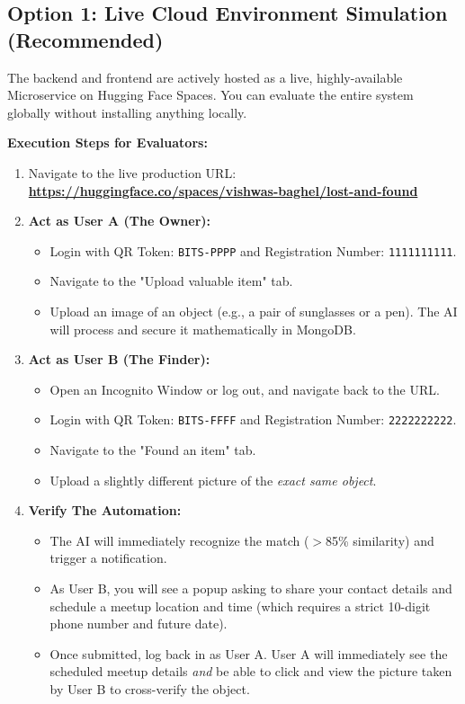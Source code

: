 \documentclass[12pt,a4paper]{article}
\begin{document}
\subsection{Option 1: Live Cloud Environment Simulation (Recommended)}
The backend and frontend are actively hosted as a live, highly-available Microservice on Hugging Face Spaces. You can evaluate the entire system globally without installing anything locally.

\textbf{Execution Steps for Evaluators:}
\begin{enumerate}
    \item Navigate to the live production URL: \textbf{\url{https://huggingface.co/spaces/vishwas-baghel/lost-and-found}}
    \item \textbf{Act as User A (The Owner):} 
    \begin{itemize}
        \item Login with QR Token: \texttt{BITS-PPPP} and Registration Number: \texttt{1111111111}.
        \item Navigate to the "Upload valuable item" tab.
        \item Upload an image of an object (e.g., a pair of sunglasses or a pen). The AI will process and secure it mathematically in MongoDB.
    \end{itemize}
    \item \textbf{Act as User B (The Finder):}
    \begin{itemize}
        \item Open an Incognito Window or log out, and navigate back to the URL.
        \item Login with QR Token: \texttt{BITS-FFFF} and Registration Number: \texttt{2222222222}.
        \item Navigate to the "Found an item" tab.
        \item Upload a slightly different picture of the \textit{exact same object}.
    \end{itemize}
    \item \textbf{Verify The Automation:}
    \begin{itemize}
        \item The AI will immediately recognize the match ($>$85\% similarity) and trigger a notification.
        \item As User B, you will see a popup asking to share your contact details and schedule a meetup location and time (which requires a strict 10-digit phone number and future date).
        \item Once submitted, log back in as User A. User A will immediately see the scheduled meetup details \textit{and} be able to click and view the picture taken by User B to cross-verify the object.
    \end{itemize}
\end{enumerate}
\end{document}
